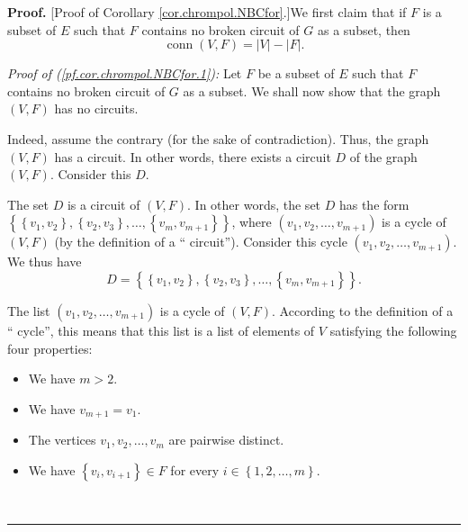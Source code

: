 \documentclass[numbers=enddot,12pt,final,onecolumn,notitlepage]{scrartcl}%
\theoremstyle{definition}
\newenvironment{proof}[1][Proof]{\noindent\textbf{#1.} }{\ \rule{0.5em}{0.5em}}
\newenvironment{verlong}{}{}
\begin{document}
\begin{verlong}
\begin{proof}
[Proof of Corollary \ref{cor.chrompol.NBCfor}.]We first claim that if $F$ is a
subset of $E$ such that $F$ contains no broken circuit of $G$ as a subset,
then%
\begin{equation}
\operatorname*{conn}\left(  V,F\right)  =\left\vert V\right\vert -\left\vert
F\right\vert . \label{pf.cor.chrompol.NBCfor.1}%
\end{equation}


\textit{Proof of (\ref{pf.cor.chrompol.NBCfor.1}):} Let $F$ be a subset of $E$
such that $F$ contains no broken circuit of $G$ as a subset. We shall now show
that the graph $\left(  V,F\right)  $ has no circuits.

Indeed, assume the contrary (for the sake of contradiction). Thus, the graph
$\left(  V,F\right)  $ has a circuit. In other words, there exists a circuit
$D$ of the graph $\left(  V,F\right)  $. Consider this $D$.

The set $D$ is a circuit of $\left(  V,F\right)  $. In other words, the set
$D$ has the form $\left\{  \left\{  v_{1},v_{2}\right\}  ,\left\{  v_{2}%
,v_{3}\right\}  ,\ldots,\left\{  v_{m},v_{m+1}\right\}  \right\}  $, where
$\left(  v_{1},v_{2},\ldots,v_{m+1}\right)  $ is a cycle of $\left(
V,F\right)  $ (by the definition of a \textquotedblleft
circuit\textquotedblright). Consider this cycle $\left(  v_{1},v_{2}%
,\ldots,v_{m+1}\right)  $. We thus have
\begin{equation}
D=\left\{  \left\{  v_{1},v_{2}\right\}  ,\left\{  v_{2},v_{3}\right\}
,\ldots,\left\{  v_{m},v_{m+1}\right\}  \right\}  .
\label{pf.cor.chrompol.NBCfor.5}%
\end{equation}


The list $\left(  v_{1},v_{2},\ldots,v_{m+1}\right)  $ is a cycle of $\left(
V,F\right)  $. According to the definition of a \textquotedblleft
cycle\textquotedblright, this means that this list is a list of elements of
$V$ satisfying the following four properties:

\begin{itemize}
\item We have $m>2$.

\item We have $v_{m+1}=v_{1}$.

\item The vertices $v_{1},v_{2},\ldots,v_{m}$ are pairwise distinct.

\item We have $\left\{  v_{i},v_{i+1}\right\}  \in F$ for every $i\in\left\{
1,2,\ldots,m\right\}  $.
\end{itemize}


\end{proof}
\end{verlong}
\end{document}
